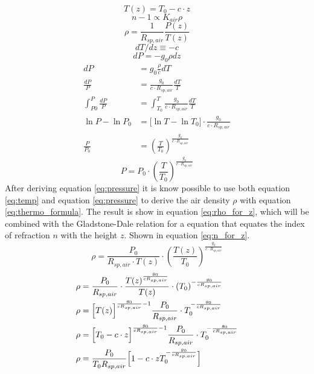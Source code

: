 \documentclass{article}
\begin{document}
\begin{equation}
	T(z) = T_0 - c \cdot z
	\label{eq:temp}
\end{equation}
\begin{equation}
	n-1 \propto K_{air} \rho
	\label{eq:glad-dale}
\end{equation}
\begin{equation}
	\rho = \frac{1}{R_{sp,air}} \frac{P(z)}{T(z)}
	\label{eq:thermo_formula}
\end{equation}
\begin{equation*}
	dT/dz \equiv -c
\end{equation*}
\begin{equation*}
	dP = -g_0 \rho dz
\end{equation*}
\begin{align*}
	dP &= g_0 \frac{\rho}{c} dT\\
	\frac{dP}{P} &= \frac{g_0}{c\cdot R_{sp,air}}\frac{dT}{T}\\
	\int_{P0}^P \frac{dP}{P} &= \int_{T_0}^T \frac{g_0}{c\cdot R_{sp,air}}\frac{dT}{T}\\
	\ln{P}-\ln{P_0} &= \big[\ln{T} - \ln{T_0}\big] \cdot \frac{g_0}{c\cdot R_{sp,air}}\\
	\frac{P}{P_0} &= (\frac{T}{T_0})^{\frac{g_0}{c\cdot R_{sp,air}}}
\end{align*}
\begin{equation}
	P = P_0 \cdot (\frac{T}{T_0})^{\frac{g_0}{c\cdot R_{sp,air}}}
	\label{eq:pressure}
\end{equation}
After deriving equation \ref{eq:pressure} it is know possible to use both equation \ref{eq:temp} and equation \ref{eq:pressure} to derive the air density $\rho$ with equation \ref{eq:thermo_formula}. The result is show in equation \ref{eq:rho_for_z}, which will be combined with the Gladstone-Dale relation for a equation that equates the index of refraction $n$ with the height $z$. Shown in equation \ref{eq:n_for_z}.\\
\begin{equation*}
	\rho = \frac{P_0}{R_{sp,air}\cdot T(z)} \cdot(\frac{T(z)}{T_0})^{\frac{g_0}{c\cdot R_{sp,air}}}
\end{equation*}
\begin{align*}
	\rho &= \frac{P_0}{R_{sp,air}} \cdot \frac{T(z)^{\frac{g_0}{c R_{sp,air}}}}{T(z)} \cdot (T_0)^{-\frac{g_0}{c R_{sp,air}}}\\
	\rho &= \Bigl[T(z) \Bigr]^{\frac{g_0}{c R_{sp,air}} -1} \frac{P_0}{R_{sp,air}} \cdot T_0^{-\frac{g_0}{c R_{sp,air}}}\\
	\rho &= \Bigl[T_0 -c\cdot z \Bigr]^{\frac{g_0}{c R_{sp,air}} -1} \frac{P_0}{R_{sp,air}} \cdot T_0^{-\frac{g_0}{c R_{sp,air}}}\\
	\rho &= \frac{P_0}{T_0 R_{sp,air}} \Bigl[1-c\cdot z T_0^{-\frac{g_0}{c R_{sp,air}}}\Bigr]
\end{align*}
\end{document}
